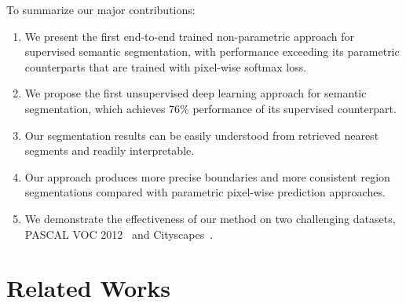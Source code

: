 \documentclass[10pt,twocolumn,letterpaper]{article}
\begin{document}
To summarize our major contributions:
\vspace{-6pt}
\begin{enumerate}
\setlength\itemsep{-2pt}

\item We present the first end-to-end trained non-parametric approach for supervised semantic segmentation, with performance exceeding its parametric counterparts that are trained with pixel-wise softmax loss.

\item We propose the first unsupervised deep learning approach for semantic segmentation, which achieves $76\%$ performance of its supervised counterpart.

\item Our segmentation results can be easily understood from retrieved nearest segments and readily interpretable.

\item Our approach produces more precise boundaries and more consistent region segmentations compared with parametric pixel-wise prediction approaches.

\item We demonstrate the effectiveness of our method on two challenging datasets, PASCAL VOC 2012~\cite{pascal-voc-2012} and Cityscapes~\cite{cordts2016cityscapes}.


\end{enumerate}






 
\section{Related Works}
\label{sec:work}
\end{document}
